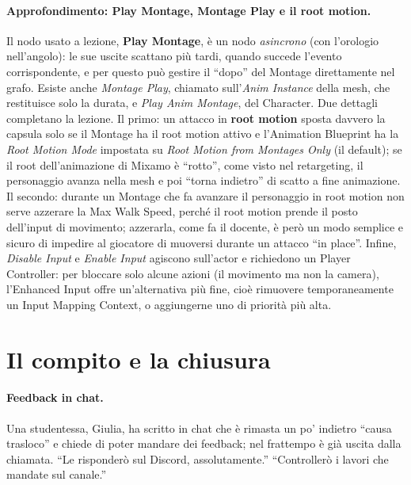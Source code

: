 \paragraph{Approfondimento: Play Montage, Montage Play e il root motion.} Il nodo usato a
lezione, \textbf{Play Montage}, è un nodo \emph{asincrono} (con l'orologio nell'angolo):
le sue uscite scattano più tardi, quando succede l'evento corrispondente, e per questo
può gestire il ``dopo'' del Montage direttamente nel grafo. Esiste anche \emph{Montage
Play}, chiamato sull'\emph{Anim Instance} della mesh, che restituisce solo la durata, e
\emph{Play Anim Montage}, del Character. Due dettagli completano la lezione. Il primo:
un attacco in \textbf{root motion} sposta davvero la capsula solo se il Montage ha il
root motion attivo e l'Animation Blueprint ha la \emph{Root Motion Mode} impostata su
\emph{Root Motion from Montages Only} (il default); se il root dell'animazione di Mixamo è
``rotto'', come visto nel retargeting, il personaggio avanza nella mesh e poi ``torna
indietro'' di scatto a fine animazione. Il secondo: durante un Montage che fa avanzare il
personaggio in root motion non serve azzerare la Max Walk Speed, perché il root motion
prende il posto dell'input di movimento; azzerarla, come fa il docente, è però un modo
semplice e sicuro di impedire al giocatore di muoversi durante un attacco ``in place''.
Infine, \emph{Disable Input} e \emph{Enable Input} agiscono sull'actor e richiedono un
Player Controller: per bloccare solo alcune azioni (il movimento ma non la camera),
l'Enhanced Input offre un'alternativa più fine, cioè rimuovere temporaneamente un
Input Mapping Context, o aggiungerne uno di priorità più alta.

\section{Il compito e la chiusura}
\label{ue9:sec:chiusura}

\paragraph{Feedback in chat.} Una studentessa, Giulia, ha scritto in chat che è rimasta un
po' indietro ``causa trasloco'' e chiede di poter mandare dei feedback; nel frattempo è
già uscita dalla chiamata. ``Le risponderò sul Discord, assolutamente.'' ``Controllerò i
lavori che mandate sul canale.''

